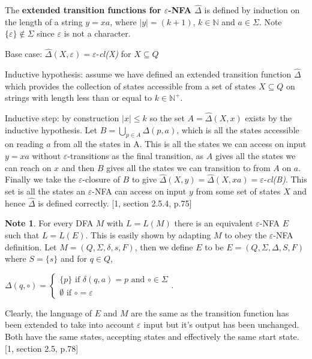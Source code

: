 \documentclass[a4paper,12pt]{report}
\theoremstyle{definition}
\newtheorem{note}{Note}[subsection]
\begin{document}
\smallskip The \textbf{extended transition functions for $\varepsilon$-NFA $\hat{\Delta}$} is defined by induction on the length of a string $y=xa$, where $|y|=(k+1)$, $k\in \mathbb{N}$ and $a\in\Sigma$. Note $\{\varepsilon\}\notin\Sigma$ since $\varepsilon$ is not a character.  

Base case: $\hat\Delta(X,\varepsilon)=\varepsilon$-\textit{cl(X)} for $X\subseteq Q$

Inductive hypothesis: assume we have defined an extended transition function $\hat{\Delta}$ which provides the collection of states accessible from a set of states $X\subseteq Q$ on strings with length less than or equal to $k\in\mathbb{N}^+$. 

Inductive step: by construction $|x|\leq k $ so the set $A=\hat{\Delta}(X,x)$   exists by the  inductive hypothesis. Let $B=\bigcup\limits_{p\in A}\Delta(p,a)$, which is all the states accessible on reading $a$ from all the states in A. This is all the states we can access on input $y=xa$ without  $\varepsilon$-transitions as the final transition, as $A$ gives all the states we can reach on $x$ and then $B$ gives all the states we can transition to from $A$ on $a$. Finally we take the  $\varepsilon$-closure of $B$ to give   $\hat{\Delta}(X,y)=\hat{\Delta}(X,xa)=\varepsilon$-\textit{cl(B)}. This set is all the states an $\varepsilon$-NFA can access on input $y$ from some set of states $X$ and hence $\hat{\Delta}$ is defined correctly. [1, section 2.5.4, p.75]


\begin{note}
\label{DFA->eNFA}
For every DFA $M$ with $L=L(M)$ there is an equivalent $\varepsilon$-NFA $E$ such that $L=L(E)$.
This is easily shown by adapting $M$ to obey the $\varepsilon$-NFA definition. Let $M=(Q,\Sigma, \delta, s, F)$, then we define $E$ to be $E=(Q,\Sigma, \Delta, S, F)$ where $S=\{s\}$ and for $q\in Q$, 

$\Delta(q,\circ)= 
\begin{cases}
\{p\} \text{ if } \delta(q,a)=p \text{ and } \circ\in\Sigma\\
\emptyset \text{ if } \circ = \varepsilon 
\end{cases}.
$

Clearly, the language of $E$ and $M$ are the same as the transition function has been extended to take into account $\varepsilon$ input but it's output has been unchanged. Both have the same states, accepting states and effectively the same start state. [1, section 2.5, p.78] 
\end{note}
 
\end{document}
